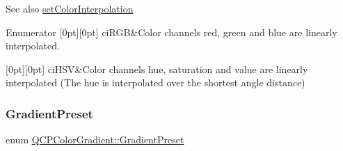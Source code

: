 \begin{DoxySeeAlso}{See also}
\hyperlink{class_q_c_p_color_gradient_aa13fda86406e1d896a465a409ae63b38}{set\+Color\+Interpolation} 
\end{DoxySeeAlso}
\begin{DoxyEnumFields}{Enumerator}
[0pt][0pt]{}\hypertarget{class_q_c_p_color_gradient_ac5dca17cc24336e6ca176610e7f77fc1a5e30f725c9cfe93999e268a9f92afbe7}{}\label{class_q_c_p_color_gradient_ac5dca17cc24336e6ca176610e7f77fc1a5e30f725c9cfe93999e268a9f92afbe7} 
ci\+R\+GB&Color channels red, green and blue are linearly interpolated. \\
\hline

[0pt][0pt]{}\hypertarget{class_q_c_p_color_gradient_ac5dca17cc24336e6ca176610e7f77fc1af14ae62fcae11ecc07234eeaec5856cb}{}\label{class_q_c_p_color_gradient_ac5dca17cc24336e6ca176610e7f77fc1af14ae62fcae11ecc07234eeaec5856cb} 
ci\+H\+SV&Color channels hue, saturation and value are linearly interpolated (The hue is interpolated over the shortest angle distance) \\
\hline

\end{DoxyEnumFields}
\hypertarget{class_q_c_p_color_gradient_aed6569828fee337023670272910c9072}{}\label{class_q_c_p_color_gradient_aed6569828fee337023670272910c9072} 
\subsubsection{\texorpdfstring{Gradient\+Preset}{GradientPreset}}
{\footnotesize\ttfamily enum \hyperlink{class_q_c_p_color_gradient_aed6569828fee337023670272910c9072}{Q\+C\+P\+Color\+Gradient\+::\+Gradient\+Preset}}

